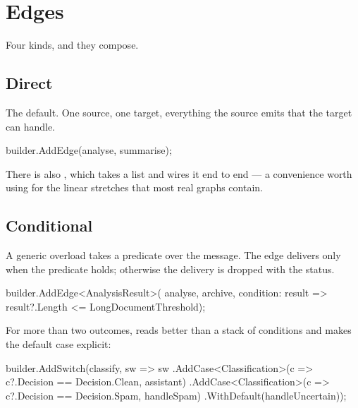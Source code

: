 \section{Edges}
\label{sec:wf-edges}

Four kinds, and they compose.

\subsection{Direct}

The default. One source, one target, everything the source emits that the target
can handle.

\begin{csharp}[caption={A direct edge}, label={lst:wf-edge-direct}]
builder.AddEdge(analyse, summarise);
\end{csharp}

There is also , which takes a list and wires it end to end --- a
convenience worth using for the linear stretches that most real graphs contain.

\subsection{Conditional}

A generic overload takes a predicate over the message. The edge delivers only
when the predicate holds; otherwise the delivery is dropped with the
 status.

\begin{csharp}[caption={A conditional edge}, label={lst:wf-edge-conditional}]
builder.AddEdge<AnalysisResult>(
    analyse,
    archive,
    condition: result => result?.Length <= LongDocumentThreshold);
\end{csharp}

For more than two outcomes,  reads better than a stack of
conditions and makes the default case explicit:

\begin{csharp}[caption={Switch-case routing}, label={lst:wf-edge-switch}]
builder.AddSwitch(classify, sw => sw
    .AddCase<Classification>(c => c?.Decision == Decision.Clean,   assistant)
    .AddCase<Classification>(c => c?.Decision == Decision.Spam,    handleSpam)
    .WithDefault(handleUncertain));
\end{csharp}

